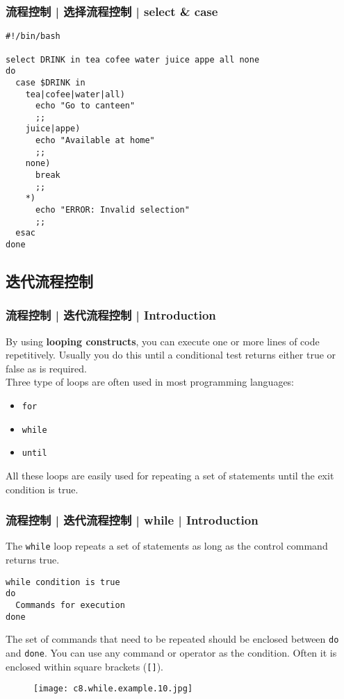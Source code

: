 \begin{frame}[fragile]
  \frametitle{流程控制 | 选择流程控制 | \alert{select \& case}}
\begin{lstlisting}[basicstyle=\footnotesize\tt]
#!/bin/bash

select DRINK in tea cofee water juice appe all none
do
  case $DRINK in
    tea|cofee|water|all) 
      echo "Go to canteen"
      ;;
    juice|appe)
      echo "Available at home"
      ;;
    none) 
      break 
      ;;
    *)
      echo "ERROR: Invalid selection" 
      ;;
  esac
done
\end{lstlisting}
\end{frame}

\subsection{迭代流程控制}
\begin{frame}[fragile]
  \frametitle{流程控制 | 迭代流程控制 | Introduction}
  By using \textbf{looping constructs}, you can execute one or more
  lines of code repetitively. Usually you do this until a conditional
  test returns either true or false as is required.\\
  \vspace{0.3cm}
  Three type of loops are often used in most programming languages:
  \begin{itemize}
    \item \verb|for|
    \item \verb|while|
    \item \verb|until|
  \end{itemize}
  All these loops are easily used for repeating a set of statements until the exit condition is true.
\end{frame}

\begin{frame}[fragile]
  \frametitle{流程控制 | 迭代流程控制 | while | Introduction}
  The \verb|while| loop repeats a set of statements as long as the control command returns true.\\
  \vspace{-0.2cm}
\begin{lstlisting}
while condition is true
do
  Commands for execution
done
\end{lstlisting}
  \vspace{-0.1cm}
  The set of commands that need to be repeated should be enclosed between \verb|do| and \verb|done|. You can use any command or operator as the condition.  Often it is enclosed within square brackets (\verb|[]|).\\
  \vspace{-0.2cm}
  \begin{figure}
    \centering
    \texttt{[image: c8.while.example.10.jpg]}
  \end{figure}
\end{frame}

